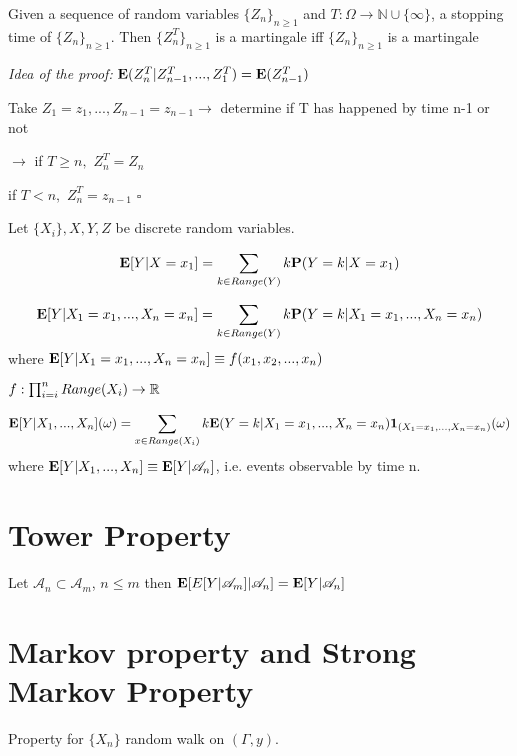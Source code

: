 \documentclass[main]{subfiles}
\begin{document}
\begin{theorem}
     Given a sequence of random variables $\{Z_n\}_{n\geq 1}$ and $T: \Omega \longrightarrow \mathbb{N} \cup \{\infty\}$, a stopping time of $\{Z_n\}_{n\geq 1}$. Then $\{Z_n^T\}_{n\geq 1}$ is a martingale iff $\{Z_n\}_{n\geq 1}$ is a martingale
\end{theorem}

\textit{Idea of the proof:}
$\mathbf E(Z_n^T| Z_{n-1}^T, ..., Z_1^T)= \mathbf E(Z_{n-1}^T)$

Take $Z_1 = z_1, ... , Z_{n-1} = z_{n-1} \rightarrow$ determine if T has happened by time n-1 or not

$\rightarrow$ if $T \geq n,$  $Z_n^T= Z_n$

\hspace{4mm}	if $T < n, $  $Z_n^T= z_{n-1}$ $\square$



Let $\{X_i\}, X, Y, Z$ be discrete random variables.

\begin{equation}
     \mathbf E[Y| X=x_1] = \sum_{k \in Range(Y)}k\mathbf P(Y=k| X=x_1)
\end{equation}

\begin{equation}
     \mathbf E[Y| X_1=x_1, ..., X_n=x_n] = \sum_{k \in Range(Y)}k\mathbf P(Y=k| X_1=x_1, ..., X_n=x_n)
\end{equation}
where $\mathbf E[Y| X_1=x_1, ..., X_n=x_n]\equiv f(x_1, x_2,..., x_n)$

$ f: \prod_{i=i}^n Range(X_i) \rightarrow \mathbb R$

\begin{eqnarray}
     \mathbf E[Y| X_1, ..., X_n](\omega) = \sum_{x \in Range(X_i)}k\mathbf E(Y=k| X_1=x_1, ..., X_n=x_n)\mathbf{1}_{(X_1=x_1, ..., X_n=x_n)}(\omega)
\end{eqnarray}
where $\mathbf E[Y| X_1, ..., X_n] \equiv \mathbf E[Y| \mathscr{A}_n]$, i.e. events observable by time n.


\section{Tower Property}
Let $\mathscr{A}_n \subset \mathscr{A}_m $, $n \leq m$
then $\mathbf E[E[Y|\mathscr{A}_m]|\mathscr{A}_n]= \mathbf E[Y|\mathscr{A}_n]$
\section{Markov property and Strong Markov Property}
Property for $\{X_n\}$ random walk on $(\Gamma,y)$.
\end{document}
